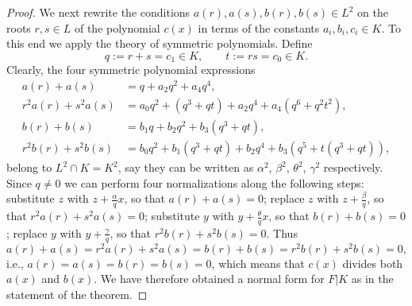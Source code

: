 \documentclass[12pt,reqno]{amsart}
\newcommand{\todoo}[2][]{\todo[size=tiny, #1]{#2}} %
\newcommand{\toda}[2][]{\todo[color=blue!30, #1]{#2}} %
\theoremstyle{definition}
\newcommand{\al}{\alpha}
\newcommand{\be}{\beta}
\newcommand{\te}{\theta}
\newcommand{\ga}{\gamma}
\begin{document}
\begin{proof}
We next rewrite the conditions $a(r),a(s),b(r),b(s)\in L^2$ on the roots $r,s \in L$ of the polynomial $c(x)$ in terms of the constants $a_i,b_i,c_i \in K$. 
To this end we apply the theory of symmetric polynomials.
Define
\[ q:= r+s = c_1 \in K, \qquad t := rs = c_0 \in K. \]
Clearly, the four symmetric polynomial expressions
\begin{align*}
    a(r)+a(s) &=q+a_2 q^2 + a_4 q^4, \\
    r^2 a(r) + s^2 a(s) &= a_0 q^2 + (q^3 + qt) + a_2 q^4 + a_4 (q^6 + q^2 t^2), \\
    b(r) + b(s) &= b_1 q + b_2 q^2 + b_3 (q^3 + qt), \\ %
    r^2 b(r) + s^2 b(s) &= b_0 q^2 + b_1 (q^3 + qt) + b_2 q^4 + b_3 (q^5 + t (q^3 + qt)), %
\end{align*}
belong to $L^2\cap K =K^2$, say they can be written as $\al^2$, $\be^2$, $\te^2$, $\ga^2$ respectively. Since $q\neq 0$ we can perform four normalizations along the following steps: 
substitute $z$ with $z+ \frac \al q x$, so that $a(r)+a(s)=0$; 
replace $z$ with $z+\frac\be q$, so that $r^2 a(r) + s^2 a(s) = 0$; 
substitute $y$ with $y + \frac \te q x$, so that $b(r)+b(s)=0$; 
replace $y$ with $y + \frac \ga q$, so that $r^2 b(r) + s^2 b(s) =0$.
Thus
\[ a(r) + a(s) = r^2 a(r) + s^2 a(s) = b(r) + b(s) = r^2 b(r) + s^2 b(s) = 0, \]
i.e., $a(r)=a(s)=b(r)=b(s)=0$, which means that $c(x)$ divides both $a(x)$ and $b(x)$. 
We have therefore obtained a normal form for $F|K$ as in the statement of the theorem.


\end{proof}
\end{document}
